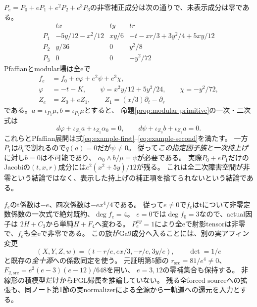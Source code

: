 $P_e=P_0+eP_1+e^2P_2+e^3P_3$の非零補正成分は次の通りで、未表示成分は零である。
\[
\begin{array}{c|ccc}
 &tx&ty&tr\\\hline
 P_1&-5y/12-x^2/12&xy/6&-t-xr/3+3y^2/4+5xy/12\\
 P_2&y/36&0&y^2/8\\
 P_3&0&0&-y^2/72
\end{array}
\]
Pfaffianとmodular場は全eで
\begin{align*}
 f_e&=f_0+e\varphi+e^2\psi+e^3\chi,\\
 \varphi&=-t-K,\qquad
 \psi=x^2y/12+5y^2/24,\qquad\chi=-y^2/72,\\
 Z_e&=Z_0+eZ_1,\qquad Z_1=(x/3)\partial_t-\partial_r
\end{align*}
である。$a=\iota_{P_1}\mu,b=\iota_{P_2}\mu$とすると、
命題\ref{prop:modular-primitive}の一次・二次式は
\[
 d\varphi+\iota_{Z_0}a+\iota_{Z_1}\alpha_0=0,\qquad
 d\psi+\iota_{Z_0}b+\iota_{Z_1}a=0.
\]
これらとPfaffian展開は式\eqref{eq:example-first}--\eqref{eq:example-second}を満たす。
一方$P_1$は$\partial_t$で割れるので$q(a)=0$だが$\psi\ne0$。
従って\emph{この指定因子族と一次持上げ}に対し$b=0$は不可能であり、
$\alpha_0\wedge b/\mu=\psi$が必要である。
実際$P_0+eP_1$だけのJacobiの$(t,x,r)$成分には$e^2(x^2+5y)/12$が残る。
これは全二次障害空間が非零という結論ではなく、表示した持上げの補正項を捨てられないという結論である。

$f_e$のt係数は$-e$、四次係数は$-ex^4/4$である。
従って$e\ne0$で$f_e$はtについて非零定数係数の一次式で絶対既約、$\deg f_e=4$。
$e=0$では$\deg f_0=3$なので、actual因子は
$2H+C_3$から単純$H+F_4$へ変わる。
$P_e^{xy}=1$により全eで射影tensorは非零で、$f_e$も全eで非零である。
この族がGa9成分へ入ることには、別の実アフィン変更
\[
 (X,Y,Z,w)=(t-r/e,ex/3,-r/e,3y/e),\qquad \det=1/e
\]
と既存の\emph{全十源}への係数同定を使う。
元証明第5節の
$r_{\mathrm{src}}=81/e^4\ne0$、$F_{2,\mathrm{src}}=e^2(e-3)(e-12)/648$を用い、
$e=3,12$の零補集合も保持する。
非線形の積模型だけからPGL帰属を推論していない。
残る全forced sourceへの拡張も、同ノート第1節の実normalizerによる全源から一軌道への還元を入力とする。

